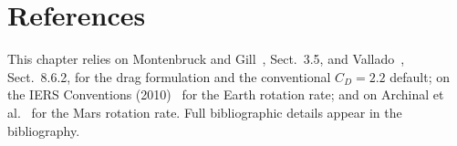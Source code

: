 \section{References}
\label{sec:drag:references}

This chapter relies on Montenbruck and Gill~\cite{montenbruck2000},
Sect.~3.5, and Vallado~\cite{vallado2013}, Sect.~8.6.2, for the drag
formulation and the conventional $C_D = 2.2$ default; on the IERS
Conventions (2010)~\cite{iers2010} for the Earth rotation rate; and on
Archinal et al.~\cite{archinal2018} for the Mars rotation rate. Full
bibliographic details appear in the bibliography.
